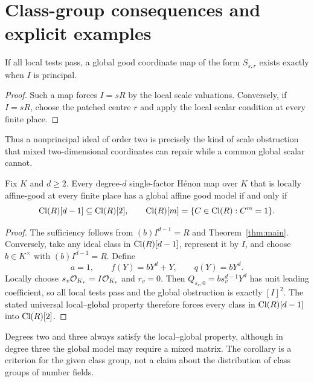 \section{Class-group consequences and explicit examples}\label{sec:examples}

\begin{corollary}
If all local tests pass, a global good coordinate map of the form
$S_{s,r}$ exists exactly when $I$ is principal.
\end{corollary}
\begin{proof}
Such a map forces $I=sR$ by the local scale valuations. Conversely,
if $I=sR$, choose the patched centre $r$ and apply the local scalar
condition at every finite place.
\end{proof}

Thus a nonprincipal ideal of order two is precisely the kind of
scale obstruction that mixed two-dimensional coordinates can repair
while a common global scalar cannot.

\begin{corollary}\label{cor:classgroup}
Fix $K$ and $d\ge2$. Every degree-$d$ single-factor H\'enon map over
$K$ that is locally affine-good at every finite place has a global
affine good model if and only if
\begin{equation}\label{eq:classcriterion}
 \operatorname{Cl}(R)[d-1]\subseteq\operatorname{Cl}(R)[2],
 \qquad \operatorname{Cl}(R)[m]=\{C\in\operatorname{Cl}(R):C^m=1\}.
\end{equation}
\end{corollary}
\begin{proof}
The sufficiency follows from $(b)I^{d-1}=R$ and
Theorem~\ref{thm:main}. Conversely, take any ideal class in
$\operatorname{Cl}(R)[d-1]$, represent it by $I$, and choose $b\in K^\times$
with $(b)I^{d-1}=R$. Define
\begin{equation}\label{eq:realization}
 a=1,\qquad f(Y)=bY^d+Y,\qquad q(Y)=bY^d.
\end{equation}
Locally choose $s_v\mathcal O_{K_v}=I\mathcal O_{K_v}$ and $r_v=0$.
Then $Q_{s_v,0}=bs_v^{d-1}Y^d$ has unit leading coefficient, so all
local tests pass and the global obstruction is exactly $[I]^2$.
The stated universal local--global property therefore forces every
class in $\operatorname{Cl}(R)[d-1]$ into $\operatorname{Cl}(R)[2]$.
\end{proof}

Degrees two and three always satisfy the local--global property,
although in degree three the global model may require a mixed matrix.
The corollary is a criterion for the given class group, not a claim
about the distribution of class groups of number fields.

